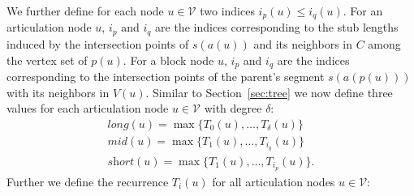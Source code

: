 \documentclass[a4paper,english,numberwithinsect]{eurocg18}
\newcommand{\sollong}{\ensuremath{\textit{long}}\xspace}
\newcommand{\solmid}{\ensuremath{\textit{mid}}\xspace}
\newcommand{\solshort}{\ensuremath{\textit{short}}\xspace}
\begin{document}
We further define for each node $ u \in \mathcal V $ two indices $ i_p(u) \le i_q(u) $. %
For an articulation node $u$, $i_p$ and $i_q$ are the indices corresponding to the stub lengths induced by the intersection points of $s(a(u))$ and its neighbors in $C$ among the vertex set of $p(u)$.
For a block node $u$, $i_p$ and $i_q$ are the indices corresponding to the intersection points of the parent's segment $s(a(p(u)))$ with its neighbors in $V(u)$.
Similar to Section~\ref{sec:tree} we now define three values for each articulation node $ u \in \mathcal V $ with degree $ \delta $:
\begin{align*}
	\sollong(u) = \max\{T_0(u),\dots,T_\delta(u)\}\\
	\solmid(u) = \max\{T_1(u),\dots,T_{i_q}(u)\}\\
	\solshort(u) = \max\{T_1(u),\dots,T_{i_p}(u)\}.
\end{align*}
Further we define the recurrence $T_i(u)$ for all articulation nodes $u \in \mathcal V$:
\end{document}
